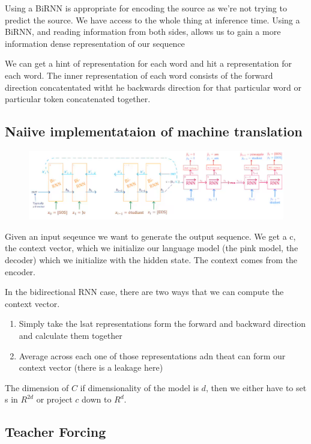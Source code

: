 \documentclass[11pt]{article}
\begin{document}
Using a BiRNN is appropriate for encoding the source as we’re not trying to
predict the source. We have access to the whole thing at inference time. Using
a BiRNN, and reading information from both sides, allows us to gain a more
information dense representation of our sequence

We can get a hint of representation for each word and hit a representation for each word. The inner representation of each word consists of the forward direction concatentated witht he backwards direction for that particular word or particular token concatenated together.

\subsection{Naiive implementataion of machine translation}

\begin{figure}[H]
    \centering
    \includegraphics*[width=\linewidth]{figures/naiive-rnn.png}
\end{figure}

Given an input seqeunce we want to generate the output sequence. We get a c, the context vector, which we initialize our language model (the pink model, the decoder) which we initialize with the hidden state. The context comes from the encoder.

In the bidirectional RNN case, there are two ways that we can compute the context vector. 

\begin{enumerate}
    \item Simply take the lsat representations form the forward and backward direction and calculate them together
    \item Average across each one of those representations adn theat can form our context vector (there is a leakage here)
\end{enumerate}

The dimension of $C$ if dimensionality of the model is $d$, then we either have to set s in $R^{2d}$ or project $c$ down to $R^d$.

\subsection{Teacher Forcing}
\end{document}
